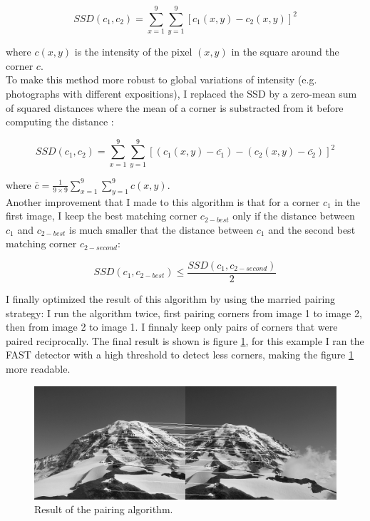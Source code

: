 \documentclass[a4paper,twocolumn]{article}
\begin{document}
$$
SSD(c_1, c_2) = \sum_{x = 1}^{9} \sum_{y = 1}^{9} \left[c_1(x, y) - c_2(x, y)\right]^2
$$

where $c(x,y)$ is the intensity of the pixel $(x,y)$ in the square around the corner $c$.
\\

To make this method more robust to global variations of intensity (e.g. photographs with different expositions), I replaced the SSD by a zero-mean sum of squared distances where the mean of a corner is substracted from it before computing the distance :

$$
SSD(c_1, c_2) = \sum_{x = 1}^{9} \sum_{y = 1}^{9} \left[(c_1(x, y) - \bar{c_1}) - (c_2(x, y) - \bar{c_2})\right]^2
$$

where $\bar{c} = \frac{1}{9\times9} \sum_{x = 1}^{9} \sum_{y = 1}^{9} c(x,y)$.
\\

Another improvement that I made to this algorithm is that for a corner $c_1$ in the first image, I keep the best matching corner $c_{2-best}$ only if the distance between $c_1$ and $c_{2-best}$ is much smaller that the distance between $c_1$ and the second best matching corner $c_{2-second}$:

$$
SSD(c_1, c_{2-best}) \le \frac{SSD(c_1, c_{2-second})}{2}
$$

I finally optimized the result of this algorithm by using the married pairing strategy: I run the algorithm twice, first pairing corners from image 1 to image 2, then from image 2 to image 1. I finnaly keep only pairs of corners that were paired reciprocally. The final result is shown is figure \ref{pairing}, for this example I ran the FAST detector with a high threshold to detect less corners, making the figure \ref{pairing} more readable.

\begin{figure}
	\centering\includegraphics[width=\textwidth]{images/pairs.png}
	\caption{Result of the pairing algorithm.}
	\label{pairing}
\end{figure}
\end{document}
